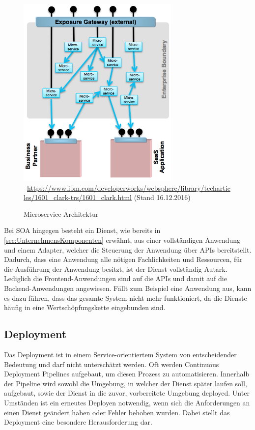 \begin{figure}[htb]
    \centering 
    \includegraphics[width=300px]{content/images/figure6}\
    \quelle\url{https://www.ibm.com/developerworks/websphere/library/techarticles/1601_clark-trs/1601_clark.html} (Stand 16.12.2016)
    \caption{Microservice Architektur}
    \label{fig:MicroserviceArchitekturInGreenField} 
\end{figure}
\newpage
Bei SOA hingegen besteht ein Dienst, wie bereits in \ref{sec:UnternehmensKomponenten}  erwähnt, aus einer vollständigen Anwendung und einem Adapter, welcher die Steuerung der Anwendung über APIs bereitstellt. Dadurch, dass eine Anwendung alle nötigen Fachlichkeiten und Ressourcen, für die Ausführung der Anwendung besitzt, ist der Dienst vollständig Autark. Lediglich die Frontend-Anwendungen sind auf die APIs und damit auf die Backend-Anwendungen angewiesen. Fällt zum Beispiel eine Anwendung aus, kann es dazu führen, dass das gesamte System nicht mehr funktioniert, da die Dienste häufig in eine Wertschöpfungskette eingebunden sind.

\subsection{Deployment}
\label{subsec:Deployment}
Das Deployment ist in einem Service-orientiertem System von entscheidender Bedeutung und darf nicht unterschätzt werden. Oft werden Continuous Deployment Pipelines aufgebaut, um diesen Prozess zu automatisieren. Innerhalb der Pipeline wird sowohl die Umgebung, in welcher der Dienst später laufen soll, aufgebaut, sowie der Dienst in die zuvor, vorbereitete Umgebung deployed. Unter Umständen ist ein erneutes Deployen notwendig, wenn sich die Anforderungen an einen Dienst geändert haben oder Fehler behoben wurden. Dabei stellt das Deployment eine besondere Herausforderung dar. 

